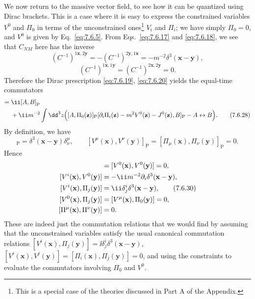 We now return to the massive vector field, to see how it can be quantized
using Dirac brackets. This is a case where it is easy to express the
constrained variables $V^0$ and $\Pi_0$ in terms of the unconstrained
ones\footnote{This is a special case of the theories discussed in Part A of
the Appendix.} $V_i$ and $\Pi_i$; we have simply $\Pi_0=0$, and $V^0$ is
given by Eq.~\eqref{eq:7.6.5}. From Eqs.~\eqref{eq:7.6.17} and \eqref{eq:7.6.18}, we see that $C_{NM}$
here has the inverse
\begin{equation}
(C^{-1})^{1\mathbf x,2\mathbf y}
=-(C^{-1})^{2\mathbf y,1\mathbf x}
=-m^{-2}\delta^3(\mathbf x-\mathbf y),
\tag{7.6.26}\label{eq:7.6.26}
\end{equation}
\begin{equation}
(C^{-1})^{1\mathbf x,1\mathbf y}
=(C^{-1})^{2\mathbf x,2\mathbf y}=0.
\tag{7.6.27}\label{eq:7.6.27}
\end{equation}
Therefore the Dirac prescription \eqref{eq:7.6.19}, \eqref{eq:7.6.20} yields the equal-time
commutators
\begin{align}
[A,B]={}&\ii[A,B]_{\mathrm P}\notag\\
&+\ii m^{-2}\int \dd^3z\Bigl(
[A,\Pi_0(\mathbf z)]_{\mathrm P}
[\partial_i\Pi_i(\mathbf z)-m^2V^0(\mathbf z)-J^0(\mathbf z),B]_{\mathrm P}
-A\leftrightarrow B\Bigr).
\tag{7.6.28}\label{eq:7.6.28}
\end{align}
By definition, we have
\begin{equation}
[V^\mu(\mathbf x),\Pi_\nu(\mathbf y)]_{\mathrm P}
=\delta^3(\mathbf x-\mathbf y)\delta^\mu_\nu,
\qquad
[V^\mu(\mathbf x),V^\nu(\mathbf y)]_{\mathrm P}
=[\Pi_\mu(\mathbf x),\Pi_\nu(\mathbf y)]_{\mathrm P}=0.
\tag{7.6.29}\label{eq:7.6.29}
\end{equation}
Hence
\begin{align}
[V^i(\mathbf x),V^j(\mathbf y)]&=[V^0(\mathbf x),V^0(\mathbf y)]=0,
\notag\\
[V^i(\mathbf x),V^0(\mathbf y)]&=-\ii m^{-2}\partial_i\delta^3(\mathbf x-\mathbf y),
\notag\\
[V^i(\mathbf x),\Pi_j(\mathbf y)]&=\ii\delta^i_j\delta^3(\mathbf x-\mathbf y),
\tag{7.6.30}\label{eq:7.6.30}\\
[V^0(\mathbf x),\Pi_j(\mathbf y)]&=[V^\mu(\mathbf x),\Pi_0(\mathbf y)]=0,
\notag\\
[\Pi^\mu(\mathbf x),\Pi^\nu(\mathbf y)]&=0.
\notag
\end{align}
These are indeed just the commutation relations that we would find by
assuming that the unconstrained variables satisfy the usual canonical
commutation relations
$[V^i(\mathbf x),\Pi_j(\mathbf y)]=\ii\delta^i_j\delta^3(\mathbf x-\mathbf y)$,
$[V^i(\mathbf x),V^j(\mathbf y)]=[\Pi_i(\mathbf x),\Pi_j(\mathbf y)]=0$,
and using the constraints to evaluate the commutators involving $\Pi_0$ and
$V^0$.
